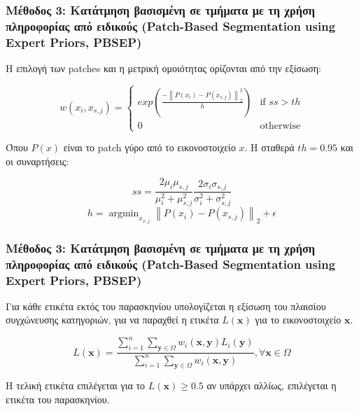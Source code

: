 \documentclass{beamer}
\newcommand{\argminB}{\mathop{\mathrm{argmin}}}
\newcommand\norm[1]{\left\lVert#1\right\rVert}
\begin{document}
\begin{frame}
\frametitle{Μέθοδος 3: Κατάτμηση βασισμένη σε τμήματα με τη χρήση
πληροφορίας από ειδικούς (Patch-Based Segmentation using Expert Priors, PBSEP)}

Η επιλογή των patches και η μετρική ομοιότητας ορίζονται από την εξίσωση:

\begin{equation*}
    w(x_i, x_{s,j}) = 
    \begin{cases}
        exp\left( \frac {- \norm{P(x_i) - P(x_{s,j})}_2^2 } {h} \right)
            & \text{if } ss > th\\
        0   & \text{otherwise}
    \end{cases}
\end{equation*}

Όπου $P(x)$ είναι το patch γύρο από το εικονοστοιχείο $x$. Η σταθερά $th = 0.95$
και οι συναρτήσεις:

\begin{equation*}
    ss = \frac {2 \mu_i \mu_{s,j}} {\mu_i^2 + \mu_{s,j}^2} 
         \frac {2 \sigma_i \sigma_{s,j}} {\sigma_i^2 + \sigma_{s,j}^2}
\end{equation*}
\begin{equation*}
    h = \argminB_{x_{x,j}} \norm{P(x_i) - P(x_{s,j})}_2 + \epsilon
\end{equation*}

\end{frame}


\begin{frame}
\frametitle{Μέθοδος 3: Κατάτμηση βασισμένη σε τμήματα με τη χρήση
πληροφορίας από ειδικούς (Patch-Based Segmentation using Expert Priors, PBSEP)}

Για κάθε ετικέτα εκτός του παρασκηνίου υπολογίζεται η εξίσωση του πλαισίου
συγχώνευσης κατηγοριών, για να παραχθεί η ετικέτα $L(\bm{x})$ για το
εικονοστοιχείο $\bm{x}$.

\begin{equation*}
    L(\bm{x})=\frac{ \sum_{i=1}^{n}  \sum_{\bm{y}\in\Omega}
                     w_i(\bm{x},\bm{y})L_i(\bm{y})}
    { \sum_{i=1}^{n}  \sum_{\bm{y}\in\Omega} w_i(\bm{x},\bm{y}) }
    , \forall \bm{x}\in\Omega
\end{equation*}

Η τελική ετικέτα επιλέγεται για το $L(\bm{x}) \geq 0.5$ αν υπάρχει αλλίως,
επιλέγεται η ετικέτα του παρασκηνίου.

\end{frame}
\end{document}
